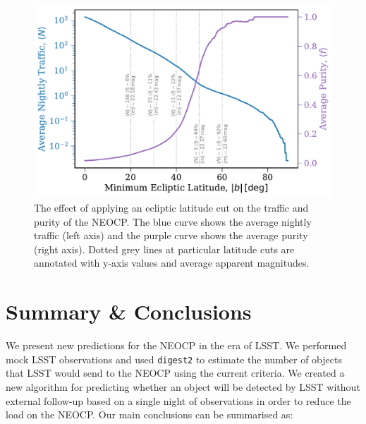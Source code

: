 \documentclass[twocolumn]{aastex631}
\newcommand{\dig}{\texttt{digest2}}
\begin{document}
\begin{figure}
    \centering
    \includegraphics[width=\columnwidth]{paper/figures/ecliptic_latitude_cutoff.pdf}
    \caption{The effect of applying an ecliptic latitude cut on the traffic and purity of the NEOCP. The blue curve shows the average nightly traffic (left axis) and the purple curve shows the average purity (right axis). Dotted grey lines at particular latitude cuts are annotated with y-axis values and average apparent magnitudes.}
    \label{fig:ecl_lat_cutoff}
\end{figure}

\section{Summary \& Conclusions} \label{sec:conclusion}
We present new predictions for the NEOCP in the era of LSST. We performed mock LSST observations and used \dig{} to estimate the number of objects that LSST would send to the NEOCP using the current criteria. We created a new algorithm for predicting whether an object will be detected by LSST without external follow-up based on a single night of observations in order to reduce the load on the NEOCP. Our main conclusions can be summarised as:
\end{document}
